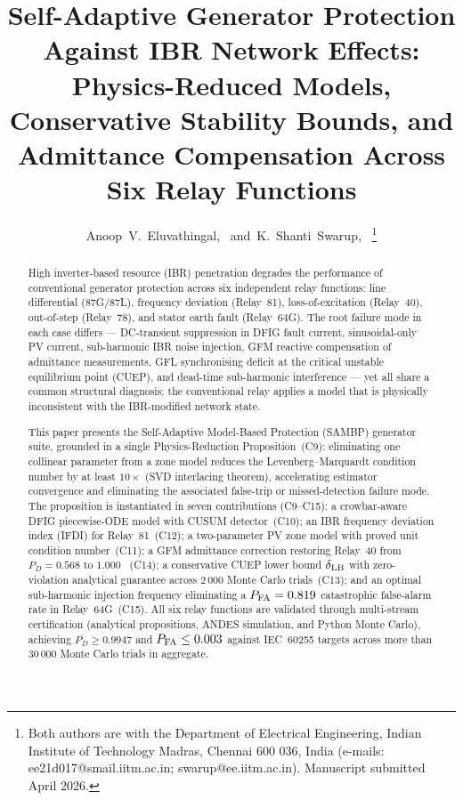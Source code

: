 \documentclass[journal,twoside]{IEEEtran}
\begin{document}
\title{Self-Adaptive Generator Protection Against IBR Network Effects:
  Physics-Reduced Models, Conservative Stability Bounds, and Admittance
  Compensation Across Six Relay Functions}

\author{Anoop~V.~Eluvathingal,~
        and~K.~Shanti~Swarup,~
\thanks{Both authors are with the Department of Electrical Engineering,
  Indian Institute of Technology Madras, Chennai 600 036, India
  (e-mails: ee21d017@smail.iitm.ac.in; swarup@ee.iitm.ac.in).
  Manuscript submitted April 2026.}}

\maketitle

\begin{abstract}
High inverter-based resource (IBR) penetration degrades the performance of
conventional generator protection across six independent relay functions: line
differential (87G/87L), frequency deviation (Relay~81), loss-of-excitation
(Relay~40), out-of-step (Relay~78), and stator earth fault (Relay~64G).
The root failure mode in each case differs --- DC-transient suppression in DFIG
fault current, sinusoidal-only PV current, sub-harmonic IBR noise injection,
GFM reactive compensation of admittance measurements, GFL synchronising deficit
at the critical unstable equilibrium point (CUEP), and dead-time sub-harmonic
interference --- yet all share a common structural diagnosis: the conventional
relay applies a model that is physically inconsistent with the IBR-modified
network state.

This paper presents the Self-Adaptive Model-Based Protection (SAMBP) generator
suite, grounded in a single Physics-Reduction Proposition~(C9): eliminating one
collinear parameter from a zone model reduces the Levenberg--Marquardt condition
number by at least $10\times$ (SVD interlacing theorem), accelerating estimator
convergence and eliminating the associated false-trip or missed-detection
failure mode.
The proposition is instantiated in seven contributions (C9--C15):
a crowbar-aware DFIG piecewise-ODE model with CUSUM detector~(C10);
an IBR frequency deviation index (IFDI) for Relay~81~(C12);
a two-parameter PV zone model with proved unit condition number~(C11);
a GFM admittance correction restoring Relay~40 from $P_D = 0.568$ to $1.000$
~(C14);
a conservative CUEP lower bound $\delta_{\rm LB}$ with zero-violation analytical
guarantee across 2\,000 Monte Carlo trials~(C13);
and an optimal sub-harmonic injection frequency eliminating a
$P_{\rm FA} = 0.819$ catastrophic false-alarm rate in Relay~64G~(C15).
All six relay functions are validated through multi-stream certification
(analytical propositions, ANDES simulation, and Python Monte Carlo), achieving
$P_D \geq 0.9947$ and $P_{\rm FA} \leq 0.003$ against IEC~60255 targets across
more than 30\,000 Monte Carlo trials in aggregate.
\end{abstract}
\end{document}
